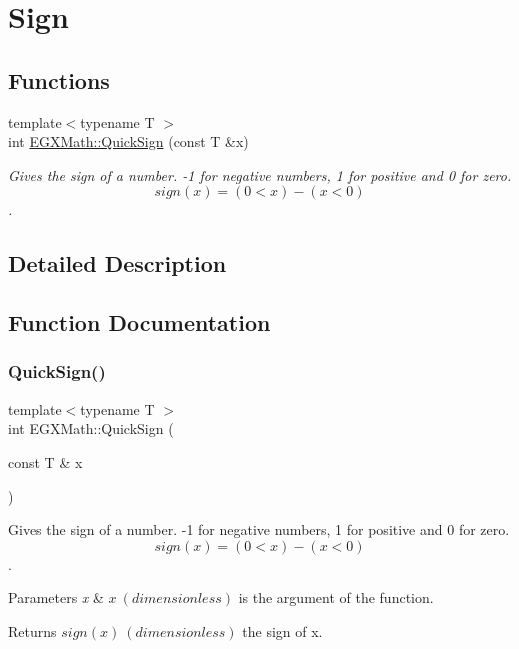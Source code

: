 \hypertarget{group___e_g_x_math-_functions-_sign}{}\section{Sign}
\label{group___e_g_x_math-_functions-_sign}
\subsection*{Functions}
\begin{DoxyCompactItemize}
\item 
{\footnotesize template$<$typename T $>$ }\\int \mbox{\hyperlink{group___e_g_x_math-_functions-_sign_ga54232a5bc24caf3833c30c15def764bf}{E\+G\+X\+Math\+::\+Quick\+Sign}} (const T \&x)
\begin{DoxyCompactList}\small\item\em Gives the sign of a number. -\/1 for negative numbers, 1 for positive and 0 for zero. \[sign(x)=(0 < x) - (x < 0) \]. \end{DoxyCompactList}\end{DoxyCompactItemize}


\subsection{Detailed Description}


\subsection{Function Documentation}
\mbox{\label{group___e_g_x_math-_functions-_sign_ga54232a5bc24caf3833c30c15def764bf}} 
\subsubsection{\texorpdfstring{Quick\+Sign()}{QuickSign()}}
{\footnotesize\ttfamily template$<$typename T $>$ \\
int E\+G\+X\+Math\+::\+Quick\+Sign (\begin{DoxyParamCaption}\item[{const T \&}]{x }\end{DoxyParamCaption})\hspace{0.3cm}{\ttfamily [inline]}}



Gives the sign of a number. -\/1 for negative numbers, 1 for positive and 0 for zero. \[sign(x)=(0 < x) - (x < 0) \]. 


\begin{DoxyParams}{Parameters}
{\em x} & $x\ (dimensionless)$ is the argument of the function. \\
\hline
\end{DoxyParams}
\begin{DoxyReturn}{Returns}
$sign(x)\ (dimensionless)$ the sign of x. 
\end{DoxyReturn}
